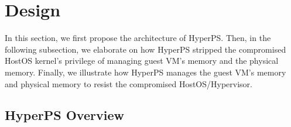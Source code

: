 \section{Design}%
\label{sec:desgin}

In this section, we first propose the architecture of HyperPS. Then, in the following subsection, we elaborate on how HyperPS stripped the compromised HostOS kernel's privilege of managing guest VM's memory and the physical memory. Finally, we illustrate how HyperPS manages the guest VM's memory and physical memory to resist the compromised HostOS/Hypervisor.


\subsection{HyperPS Overview}%
\label{sub:hyperps_overview}



